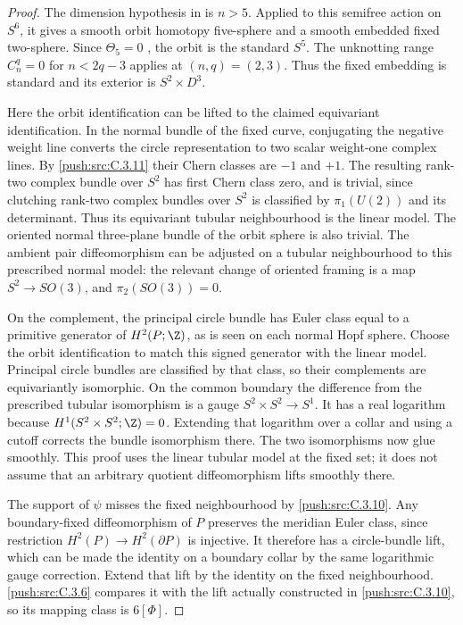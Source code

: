 \begin{proof}
The dimension hypothesis in
\citet[Section 1, Propositions 1.3--1.4]{FintushelPao1983D}
is $n>5$. Applied to this semifree action on $S^6$, it gives a
smooth orbit homotopy five-sphere and a smooth embedded fixed
two-sphere. Since $\Theta_5=0$ \citep{KervaireMilnor1963}, the
orbit is the standard $S^5$. The unknotting range
$C_n^q=0$ for $n<2q-3$
\citep[Corollary 6.6]{Haefliger1966D} applies at $(n,q)=(2,3)$.
Thus the fixed embedding is standard and its exterior is
$S^2\times D^3$.

Here the orbit identification can be lifted to the claimed
equivariant identification. In the normal bundle of the fixed
curve, conjugating the negative weight line converts the circle
representation to two scalar weight-one complex lines. By
\ref{push:src:C.3.11} their Chern classes are $-1$ and $+1$. The resulting
rank-two complex bundle over $S^2$ has first Chern class zero,
and is trivial, since clutching rank-two complex bundles over
$S^2$ is classified by $\pi_1(U(2))$ and its determinant.
Thus its equivariant tubular neighbourhood is the linear model.
The oriented normal three-plane bundle of the orbit sphere is
also trivial. The ambient pair diffeomorphism can be adjusted
on a tubular neighbourhood to this prescribed normal model:
the relevant change of oriented framing is a map
$S^2\to SO(3)$, and $\pi_2(SO(3))=0$.

On the complement, the principal circle bundle has Euler class
equal to a primitive generator of $H^2(P;\Z)$, as is seen on
each normal Hopf sphere. Choose the orbit identification to
match this signed generator with the linear model. Principal
circle bundles are classified by that class, so their complements
are equivariantly isomorphic. On the common boundary the
difference from the prescribed tubular isomorphism is a gauge
$S^2\times S^2\to S^1$. It has a real logarithm because
$H^1(S^2\times S^2;\Z)=0$. Extending that logarithm over a
collar and using a cutoff corrects the bundle isomorphism there.
The two isomorphisms now glue smoothly. This proof uses the
linear tubular model at the fixed set; it does not assume that
an arbitrary quotient diffeomorphism lifts smoothly there.

The support of $\psi$ misses the fixed neighbourhood by \ref{push:src:C.3.10}.
Any boundary-fixed diffeomorphism of $P$ preserves the meridian
Euler class, since restriction $H^2(P)\to H^2(\partial P)$ is
injective. It therefore has a circle-bundle lift, which can be
made the identity on a boundary collar by the same logarithmic
gauge correction. Extend that lift by the identity on the fixed
neighbourhood. \ref{push:src:C.3.6} compares it with the lift actually constructed
in \ref{push:src:C.3.10}, so its mapping class is $6[\Phi]$.


\end{proof}
